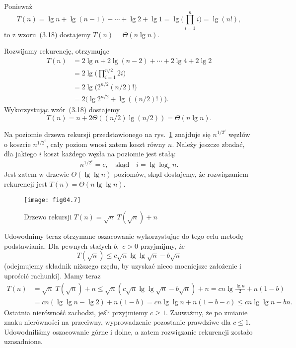\subexercise{} %
Ponieważ
\[
	T(n) = \lg n+\lg(n-1)+\cdots+\lg2+\lg 1 = \lg\biggl(\prod_{i=1}^ni\biggr) = \lg(n!),
\]
to z wzoru~(3.18) dostajemy $T(n)=\Theta(n\lg n)$.

\subexercise{} %
Rozwijamy rekurencję, otrzymując
\begin{align*}
	T(n) &= 2\lg n+2\lg(n-2)+\cdots+2\lg4+2\lg2 \\
	&= 2\lg\biggl(\prod_{i=1}^{n/2}2i\biggr) \\
	&= 2\lg\bigl(2^{n/2}(n/2)!\bigr) \\
	&= 2\bigl(\lg 2^{n/2}+\lg((n/2)!)\bigr).
\end{align*}
Wykorzystując wzór~(3.18) dostajemy
\[
	T(n) = n+2\Theta((n/2)\lg (n/2)) = \Theta(n\lg n).
\]

\subexercise{} %
Na  poziomie drzewa rekursji przedstawionego na rys.~\ref{fig:4-4j} znajduje się $n^{1/2^i}$ węzłów o koszcie $n^{1/2^i}$, cały poziom wnosi zatem koszt równy $n$. Należy jeszcze zbadać, dla jakiego $i$ koszt każdego węzła na  poziomie jest stałą:
\[
	n^{1/2^i} = c, \quad\text{skąd}\quad i = \lg\log_cn.
\]
Jest zatem w drzewie $\Theta(\lg\lg n)$ poziomów, skąd dostajemy, że rozwiązaniem rekurencji jest $T(n)=\Theta(n\lg\lg n)$.
\begin{figure}[ht]
	\begin{center}
		\texttt{[image: fig04.7]}
	\caption{Drzewo rekursji $T(n)=\sqrt{n}\;T(\!\sqrt{n})+n$} \label{fig:4-4j}
	\end{center}
\end{figure}

Udowodnimy teraz otrzymane oszacowanie wykorzystując do tego celu metodę podstawiania. Dla pewnych stałych $b$,~$c>0$ przyjmijmy, że
\[
	T(\!\sqrt{n}) \le c\sqrt{n}\lg\lg\sqrt{n}-b\sqrt{n}
\]
(odejmujemy składnik niższego rzędu, by uzyskać nieco mocniejsze założenie i uprościć rachunki). Mamy teraz
\begin{align*}
	T(n) &= \sqrt{n}\;T(\!\sqrt{n})+n \le \sqrt{n}\left(c\sqrt{n}\lg\lg\sqrt{n}-b\sqrt{n}\right)+n = cn\lg\frac{\lg n}{2}+n(1-b) \\
	&= cn(\lg\lg n-\lg2)+n(1-b) = cn\lg\lg n+n(1-b-c) \le cn\lg\lg n-bn.
\end{align*}
Ostatnia nierówność zachodzi, jeśli przyjmiemy $c\ge1$. Zauważmy, że po zmianie znaku nierówności na przeciwny, wyprowadzenie pozostanie prawdziwe dla $c\le1$. Udowodniliśmy oszacowanie górne i dolne, a zatem rozwiązanie rekurencji zostało uzasadnione.

